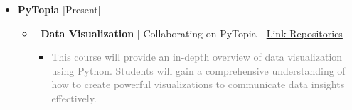 \documentclass[10pt,a4paper,sans]{moderncv} %
\begin{document}
               \begin{itemize}
		\item {} \textbf{PyTopia }     \hfill[Present]
		\vspace{0.5em}

      \begin{itemize}
       \item{} | \textbf{Data Visualization} | Collaborating on PyTopia  - \href{https://github.com/pytopia}{Link Repositories}
        
		\begin{itemize}
			\item \textcolor{gray}{This course will provide an in-depth overview of data visualization using Python. Students will gain a comprehensive understanding of how to create powerful visualizations to communicate data insights effectively.}


 

			\end{itemize}	
				
		\end{itemize}
  
		\end{itemize}




        




				
\end{document}
